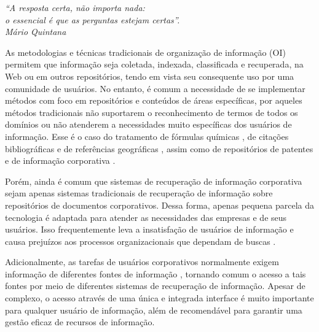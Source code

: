 

	\begin{flushright}
		\textit{``A resposta certa, não importa nada: \\o essencial é que as perguntas estejam certas''.\\
		Mário Quintana}
	\end{flushright}


As metodologias e técnicas tradicionais de organização de informação (OI) permitem que informação seja coletada, indexada, classificada e recuperada, na Web ou em outros repositórios, tendo em vista seu consequente uso por uma comunidade de usuários. No entanto, é comum a necessidade de se implementar métodos com foco em repositórios e conteúdos de áreas específicas, por aqueles métodos tradicionais não suportarem o reconhecimento de termos de todos os domínios ou não atenderem a necessidades muito específicas dos usuários de informação. Esse é o caso do tratamento de fórmulas químicas \cite{sun07}, de citações bibliográficas \cite{giles98} e de referências geográficas \cite{overellPhd09}, assim como de repositórios de patentes \cite{patents11} e de informação corporativa \cite{hu2010enterprisecase}.

Porém, ainda é comum que sistemas de recuperação de informação corporativa sejam apenas sistemas tradicionais de recuperação de informação sobre repositórios de documentos corporativos. 
Dessa forma, apenas pequena parcela da tecnologia é adaptada para atender as necessidades das empresas e de seus usuários. 
Isso frequentemente leva a insatisfação de usuários de informação e causa prejuízos aos processos organizacionais que dependam de buscas \cite{solomon2002}.

Adicionalmente, as tarefas de usuários corporativos normalmente exigem informação de diferentes fontes de informação \cite{halevy2005enterprise}, tornando comum o acesso a tais fontes por meio de diferentes sistemas de recuperação de informação. 
Apesar de complexo, o acesso através de uma única e integrada interface é muito importante para qualquer usuário de informação, além de recomendável para garantir uma gestão eficaz de recursos de informação.


